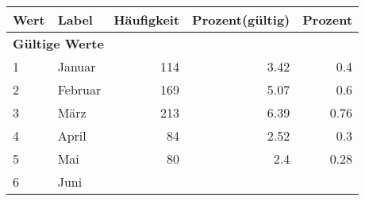      \begin{longtable}{lXrrr}
     \toprule
     \textbf{Wert} & \textbf{Label} & \textbf{Häufigkeit} & \textbf{Prozent(gültig)} & \textbf{Prozent} \\
     \endhead
     \midrule
     \multicolumn{5}{l}{\textbf{Gültige Werte}}\\

     1 &
     \multicolumn{1}{X}{ Januar   } &


       \num{114} &
       \num[round-mode=places,round-precision=2]{3,42} &
         \num[round-mode=places,round-precision=2]{0,4} \\

     2 &
     \multicolumn{1}{X}{ Februar   } &


       \num{169} &
       \num[round-mode=places,round-precision=2]{5,07} &
         \num[round-mode=places,round-precision=2]{0,6} \\

     3 &
     \multicolumn{1}{X}{ März   } &


       \num{213} &
       \num[round-mode=places,round-precision=2]{6,39} &
         \num[round-mode=places,round-precision=2]{0,76} \\

     4 &
     \multicolumn{1}{X}{ April   } &


       \num{84} &
       \num[round-mode=places,round-precision=2]{2,52} &
         \num[round-mode=places,round-precision=2]{0,3} \\

     5 &
     \multicolumn{1}{X}{ Mai   } &


       \num{80} &
       \num[round-mode=places,round-precision=2]{2,4} &
         \num[round-mode=places,round-precision=2]{0,28} \\

     6 &
     \multicolumn{1}{X}{ Juni   } &



\end{longtable}
